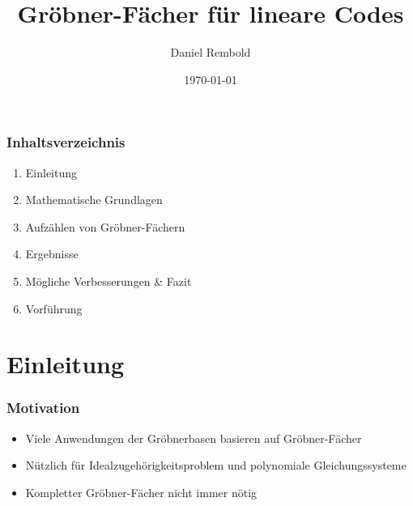 \documentclass{beamer}
\title[Gröbner-Fächer für lineare Codes]{Gröbner-Fächer für lineare Codes}
\author{Daniel Rembold}
\institute[TUHH]
{
Technische Universit{\"a}t Hamburg Harburg \\
\medskip
{\emph{daniel.rembold@tuhh.de}}
}
\date{\today}
\begin{document}
%
\begin{frame}
\titlepage
\end{frame}
%

\begin{frame}
\frametitle{Inhaltsverzeichnis}

\begin{enumerate}
			\item Einleitung \\

	      	\item Mathematische Grundlagen \\
	      	
	      	\item Aufzählen von Gröbner-Fächern  \\ 
	      		
	      	\item Ergebnisse  \\ 
	  
	      	\item Mögliche Verbesserungen \& Fazit \\

		    \item Vorführung
\end{enumerate}

\end{frame}

\section{Einleitung}



\begin{frame}
\frametitle{Motivation}

\begin{itemize}
\item
Viele Anwendungen der Gröbnerbasen basieren auf Gröbner-Fächer

\item
Nützlich für Idealzugehörigkeitsproblem und polynomiale Gleichungssysteme

\item 
Kompletter Gröbner-Fächer nicht immer nötig


\end{itemize}






\end{frame}
\end{document}
